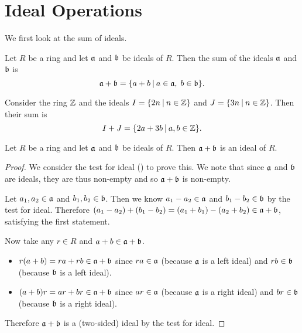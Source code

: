 \section{Ideal Operations}
We first look at the sum of ideals.
\begin{definition}
    Let $R$ be a ring and let $\mathfrak{a}$ and $\mathfrak{b}$ be ideals of $R$. Then the sum of the ideals $\mathfrak{a}$ and $\mathfrak{b}$ is
    \[
        \ideal{a} + \ideal{b} = \{a + b \vert a\in\ideal{a},\;b\in\ideal{b}\}.
    \]
\end{definition}
\begin{example}
    Consider the ring $\mathbb{Z}$ and the ideals $I = \{2n \vert n \in \Z\}$ and $J = \{3n \vert n \in \Z\}$. Then their sum is
    \[
        I + J = \{2a + 3b \vert a,b \in \Z\}.
    \]
\end{example}
\begin{proposition}
    Let $R$ be a ring and let $\mathfrak{a}$ and $\mathfrak{b}$ be ideals of $R$. Then $\mathfrak{a} + \mathfrak{b}$ is an ideal of $R$.
\end{proposition}
\begin{proof}
    We consider the test for ideal () to prove this. We note that since $\mathfrak{a}$ and $\mathfrak{b}$ are ideals, they are thus non-empty and so $\mathfrak{a}+\mathfrak{b}$ is non-empty.

    Let $a_1, a_2 \in \mathfrak{a}$ and $b_1, b_2 \in \mathfrak{b}$. Then we know $a_1 - a_2 \in \mathfrak{a}$ and $b_1 - b_2 \in \mathfrak{b}$ by the test for ideal. Therefore $(a_1 - a_2) + (b_1 - b_2) = (a_1 + b_1) - (a_2 + b_2) \in \mathfrak{a} + \mathfrak{b}$, satisfying the first statement.

    Now take any $r \in R$ and $a+b \in \mathfrak{a}+\mathfrak{b}$.
    \begin{itemize}
        \item $r(a+b) = ra + rb \in \mathfrak{a}+\mathfrak{b}$ since $ra \in \mathfrak{a}$ (because $\mathfrak{a}$ is a left ideal) and $rb \in \mathfrak{b}$ (because $\mathfrak{b}$ is a left ideal).
        \item $(a+b)r = ar + br \in \mathfrak{a}+\mathfrak{b}$ since $ar \in \mathfrak{a}$ (because $\mathfrak{a}$ is a right ideal) and $br \in \mathfrak{b}$ (because $\mathfrak{b}$ is a right ideal).
    \end{itemize}
    Therefore $\mathfrak{a} + \mathfrak{b}$ is a (two-sided) ideal by the test for ideal.
\end{proof}

\newpage


